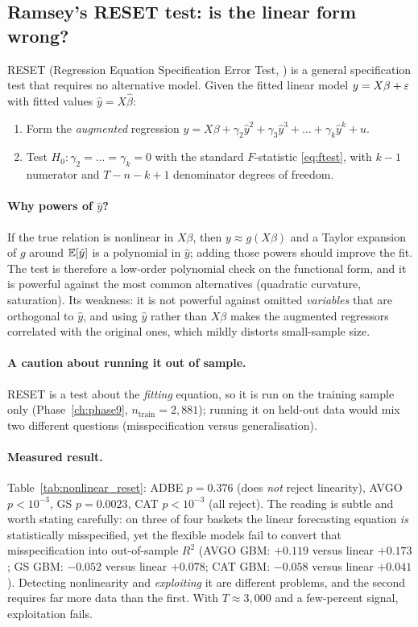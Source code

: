 \subsection{Ramsey's RESET test: is the linear form wrong?}
\label{sec:nonlinear:reset}

RESET (Regression Equation Specification Error Test, \cite{ramsey1969}) is a
general specification test that requires no alternative model. Given the fitted linear
model $y=X\beta+\varepsilon$ with fitted values $\hat y=X\hat\beta$:

\begin{enumerate}
  \item Form the \emph{augmented} regression
    $y = X\beta + \gamma_2\hat y^2 + \gamma_3\hat y^3 + \dots + \gamma_k \hat y^k + u$.
  \item Test $H_0:\gamma_2=\dots=\gamma_k=0$ with the standard $F$-statistic
    \eqref{eq:ftest}, with $k-1$ numerator and $T-n-k+1$ denominator degrees of freedom.
\end{enumerate}

\paragraph{Why powers of $\hat y$?} If the true relation is nonlinear in $X\beta$, then
$y\approx g(X\beta)$ and a Taylor expansion of $g$ around $\mathbb{E}[\hat y]$ is a polynomial in
$\hat y$; adding those powers should improve the fit. The test is therefore a
low-order polynomial check on the functional form, and it is powerful against the most
common alternatives (quadratic curvature, saturation). Its weakness: it is not powerful
against omitted \emph{variables} that are orthogonal to $\hat y$, and using $\hat y$
rather than $X\beta$ makes the augmented regressors correlated with the original ones,
which mildly distorts small-sample size.

\paragraph{A caution about running it out of sample.} RESET is a test about the
\emph{fitting} equation, so it is run on the training sample only
(Phase~\ref{ch:phase9}, $n_{\text{train}}=2{,}881$); running it on held-out data would
mix two different questions (misspecification versus generalisation).

\paragraph{Measured result.} Table~\ref{tab:nonlinear_reset}: ADBE $p=0.376$ (does
\emph{not} reject linearity), AVGO $p<10^{-3}$, GS $p=0.0023$, CAT $p<10^{-3}$ (all
reject). The reading is subtle and worth stating carefully: on three of four baskets the
linear forecasting equation \emph{is} statistically misspecified, yet the flexible models
fail to convert that misspecification into out-of-sample $R^2$ (AVGO GBM: $+0.119$ versus
linear $+0.173$; GS GBM: $-0.052$ versus linear $+0.078$; CAT GBM: $-0.058$ versus linear
$+0.041$). Detecting nonlinearity and \emph{exploiting} it are different problems, and
the second requires far more data than the first. With $T\approx3{,}000$ and a
few-percent signal, exploitation fails.

